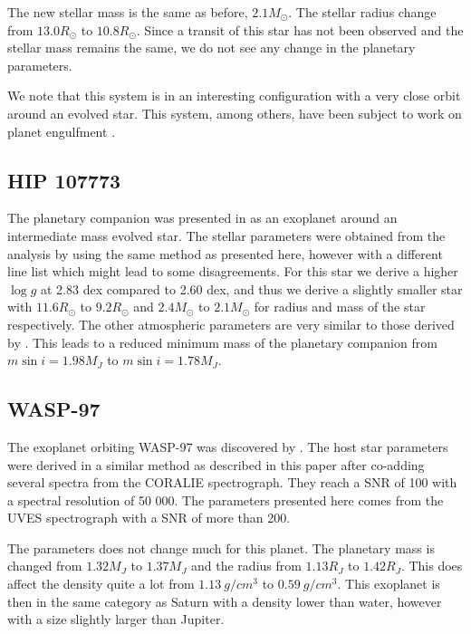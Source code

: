 \documentclass{aa}
\begin{document}
The new stellar mass is the same as before, $2.1M_\odot$. The stellar radius
change from $13.0R_\odot$ to $10.8R_\odot$. Since a transit of this star has not
been observed and the stellar mass remains the same, we do not see any change in
the planetary parameters.

We note that this system is in an interesting configuration with a very close
orbit around an evolved star. This system, among others, have been subject
to work on planet engulfment \citep[see e.g.][]{Kunitomo2011}.


\subsection{HIP 107773}
\label{sub:HIP_107773}
The planetary companion was presented in \citet{Jones2015} as an exoplanet
around an intermediate mass evolved star. The stellar parameters were obtained
from the analysis by \citet{Jones2011} using the same method as presented here,
however with a different line list which might lead to some disagreements. For
this star we derive a higher $\log g$ at 2.83 dex compared to 2.60 dex, and thus
we derive a slightly smaller star with $11.6R_\odot$ to $9.2R_\odot$ and
$2.4M_\odot$ to $2.1M_\odot$ for radius and mass of the star respectively. The
other atmospheric parameters are very similar to those derived by
\citet{Jones2011}. This leads to a reduced minimum mass of the planetary
companion from $m\sin i=1.98M_J$ to $m\sin i=1.78M_J$.



\subsection{WASP-97}
\label{sub:WASP-97}
The exoplanet orbiting WASP-97 was discovered by \citet{Hellier2014}. The host
star parameters were derived in a similar method as described in this paper
after co-adding several spectra from the CORALIE spectrograph. They reach a
SNR of 100 with a spectral resolution of 50 000. The parameters presented here
comes from the UVES spectrograph with a SNR of more than 200.

The parameters does not change much for this planet. The planetary mass is
changed from $1.32M_J$ to $1.37M_J$ and the radius from $1.13R_J$ to $1.42R_J$.
This does affect the density quite a lot from $\SI{1.13}{g/cm^3}$ to
$\SI{0.59}{g/cm^3}$. This exoplanet is then in the same category as Saturn with
a density lower than water, however with a size slightly larger than Jupiter.
\end{document}
